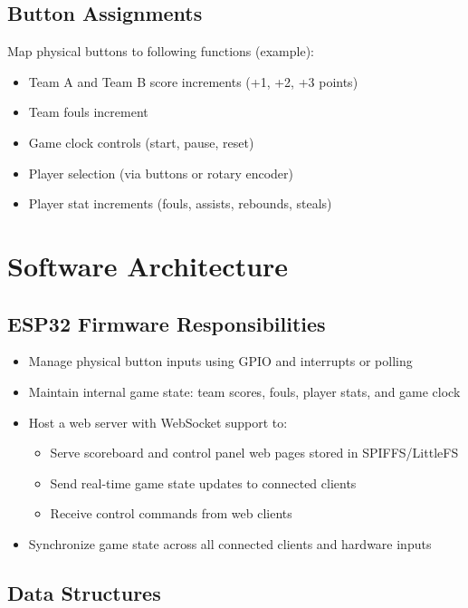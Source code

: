 \documentclass[a4paper,12pt]{article}
\begin{document}
\subsection{Button Assignments}
Map physical buttons to following functions (example):
\begin{itemize}[noitemsep]
    \item Team A and Team B score increments (+1, +2, +3 points)
    \item Team fouls increment
    \item Game clock controls (start, pause, reset)
    \item Player selection (via buttons or rotary encoder)
    \item Player stat increments (fouls, assists, rebounds, steals)
\end{itemize}

\section{Software Architecture}

\subsection{ESP32 Firmware Responsibilities}
\begin{itemize}[noitemsep]
    \item Manage physical button inputs using GPIO and interrupts or polling
    \item Maintain internal game state: team scores, fouls, player stats, and game clock
    \item Host a web server with WebSocket support to:
    \begin{itemize}[noitemsep]
        \item Serve scoreboard and control panel web pages stored in SPIFFS/LittleFS
        \item Send real-time game state updates to connected clients
        \item Receive control commands from web clients
    \end{itemize}
    \item Synchronize game state across all connected clients and hardware inputs
\end{itemize}

\subsection{Data Structures}
\end{document}
